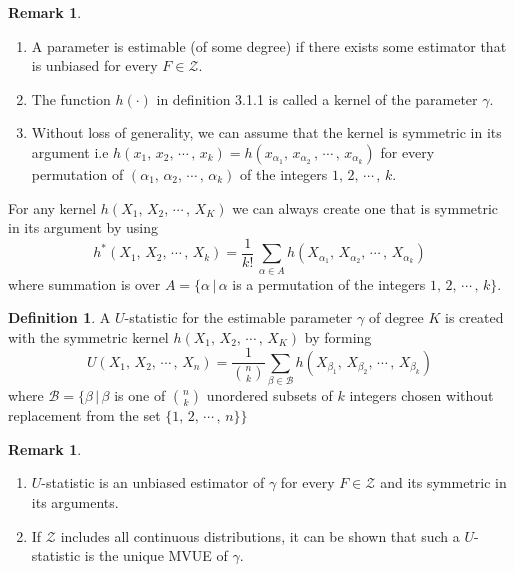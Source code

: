 \documentclass[12pt,a4paper]{report}
\theoremstyle{definition}
\newtheorem{defn}[thm]{Definition}
\newtheorem{remark}[thm]{Remark}
\theoremstyle{plain}
\begin{document}
\begin{remark}
\begin{enumerate}
\item[(i)] A parameter is estimable (of some degree) if there exists some estimator that is unbiased for every $F\in\mathscr{Z}$.
\item[(ii)] The function $h(\cdot)$ in definition 3.1.1 is called a kernel of the parameter $\gamma$.
\item[(iii)] Without loss of generality, we can assume that the kernel is symmetric in its argument i.e $h(x_1, \, x_2, \, \cdots\, , \, x_k) = h(x_{\alpha_1}, \, x_{\alpha_2}\, , \, \cdots\, , \, x_{\alpha_k})$ for every permutation of $(\alpha_1, \, \alpha_2, \, \cdots\, ,\, \alpha_k)$ of the integers $1, \, 2, \, \cdots\, , \, k$. 
\end{enumerate}
\end{remark}

For any kernel $h(X_1,\, X_2,\, \cdots\, , \, X_K)$ we can always create one that is symmetric in  its argument by using
$$h^*(X_1,\, X_2,\, \cdots\, , \, X_k) = \frac{1}{k!}\, \sum_{\alpha\in A}h(X_{\alpha_1},\, X_{\alpha_2},\, \cdots\, , \, X_{\alpha_k})$$
where summation is over $A = \{\alpha\, |\, \alpha$ is a permutation of the integers $1, \, 2, \, \cdots\, , \, k\}$.

\begin{defn}
A $U$-statistic for the estimable parameter $\gamma$ of degree $K$ is created with the symmetric kernel $h(X_1,\, X_2,\, \cdots\, , \, X_K)$ by forming
$$U(X_1,\, X_2,\, \cdots\, , \, X_n) = \frac{1}{\binom{n}{k}}\sum_{\beta\in\mathcal{B}}h(X_{\beta_1},\, X_{\beta_2},\, \cdots\, , \, X_{\beta_k})$$
where $\mathcal{B} = \{\beta\, |\,\beta$ is one of $\binom{n}{k}$ unordered subsets of $k$ integers chosen without replacement from the  set $\{1, \, 2, \, \cdots\, , \, n\}\}$
\end{defn}



\begin{remark}
\begin{enumerate}
\item[(i)] $U$-statistic is an unbiased estimator of $\gamma$ for every $F\in\mathscr{Z}$ and its symmetric in its arguments.
\item[(ii)] If $\mathscr{Z}$ includes all continuous distributions, it can be shown that such a $U$-statistic is the unique MVUE of $\gamma$.
\end{enumerate}
\end{remark}
\end{document}
